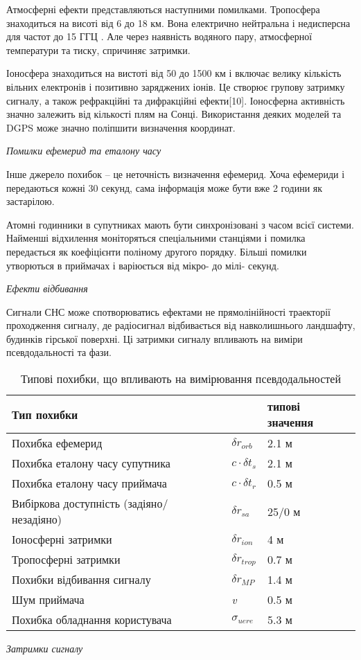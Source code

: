Атмосферні ефекти представляються наступними помилками. Тропосфера знаходиться 
на висоті від 6 до 18 км. Вона електрично нейтральна і недисперсна для частот 
до 15 ГГЦ \cite{gps1,gps2}. Але через наявність водяного пару, атмосферної температури 
та тиску, спричиняє затримки.

Іоносфера знаходиться на вистоті від 50 до 1500 км і включає велику кількість  
вільних електронів і позитивно заряджених іонів. Це створює групову затримку 
сигналу, а також рефракційні та дифракційні ефекти[10]. Іоносферна 
активність значно залежить від кількості плям на Сонці. Використання деяких 
моделей та DGPS може значно поліпшити визначення координат.

\vspace{5mm}
\textit{Помилки ефемерид та еталону часу}

Інше джерело похибок -- це неточність визначення ефемерид. Хоча 
ефемериди і передаються кожні 30 секунд, сама інформація може бути вже 2 
години як застарілою. 

Атомні годинники в супутниках мають бути синхронізовані з часом 
всієї системи. Найменші відхилення моніторяться спеціальними станціями і 
помилка передається як коефіцієнти поліному другого порядку. Більші помилки 
утворються в приймачах і варіюється від мікро- до мілі- секунд.

\vspace{5mm}
\textit{Ефекти відбивання}

Сигнали СНС може спотворюватись ефектами не прямолінійності траекторії проходження  
сигналу, де радіосигнал відбивається від навколишнього ландшафту, будинків 
гірської поверхні. Ці затримки сигналу впливають на виміри псевдодальності та фази.

\begin{table}[here]
\small
\caption{Типові похибки, що впливають на вимірювання псевдодальностей}
\centering
\begin{tabular}{|p{100mm} p{20mm} p{20mm}|} \hline 
Тип похибки& & типові значення \\ \hline 
Похибка ефемерид & $\delta r_{orb} $ & 2.1 м \\ %
Похибка еталону часу супутника & $c \cdot \delta t_{s}$ & 2.1 м \\ %
Похибка еталону часу приймача  & $c \cdot \delta t_{r}$ & 0.5 м \\ %
Вибіркова доступність (задіяно/ незадіяно) & $\delta r_{sa}$ & 25/0 м \\ %
Іоносферні затримки & $\delta r_{ion} $  & 4 м \\ %
Тропосферні затримки & $\delta r_{trop} $  & 0.7 м \\ %
Похибки відбивання сигналу & $\delta r_{MP} $  & 1.4 м \\ %
Шум приймача & \textit{v} & 0.5 м \\ \hline 
Похибка обладнання користувача & $\sigma_{uere}$ & 5.3 м \\ \hline 
\end{tabular}
\label{tb:sns_main_errors}
\end{table}
\vspace{5mm}
\textit{Затримки сигналу}

